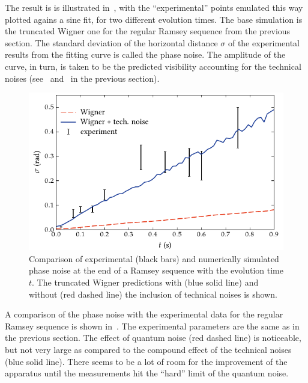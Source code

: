 The result is is illustrated in~, with the ``experimental'' points emulated this way plotted agains a sine fit, for two different evolution times.
The base simulation is the truncated Wigner one for the regular Ramsey sequence from the previous section.
The standard deviation of the horizontal distance $\sigma$ of the experimental results from the fitting curve is called the phase noise.
The amplitude of the curve, in turn, is taken to be the predicted visibility accounting for the technical noises (see~ and~ in the previous section).

\begin{figure}
    \centerline{\includegraphics{figures_generated/bec_noise/ramsey_noise.pdf}}

    \caption[Experimental and numerically simulated phase noise in Ramsey sequence]{
    Comparison of experimental (black bars) and numerically simulated phase noise at the end of a Ramsey sequence with the evolution time $t$.
    The truncated Wigner predictions with (blue solid line) and without (red dashed line) the inclusion of technical noises is shown.}%

    \label{fig:bec-noise:phase-noise:ramsey-phnoise}
\end{figure}

A comparison of the phase noise with the experimental data for the regular Ramsey sequence is shown in~.
The experimental parameters are the same as in the previous section.
The effect of quantum noise (red dashed line) is noticeable, but not very large as compared to the compound effect of the technical noises (blue solid line).
There seems to be a lot of room for the improvement of the apparatus until the measurements hit the ``hard'' limit of the quantum noise.

